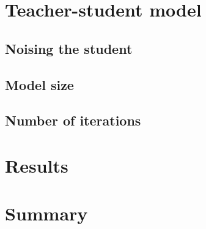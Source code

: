 \documentclass[thesis.tex]{subfiles}
\begin{document}
\section{Teacher-student model}



\subsection{Noising the student}



\subsection{Model size}





\subsection{Number of iterations}





\section{Results} \label{sec:C4-results}






\section{Summary} \label{sec:C4-summary}
\end{document}
